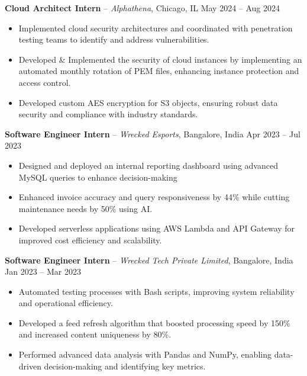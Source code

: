 \documentclass[10pt, letterpaper]{article}
\begin{document}
\textbf{\textcolor{myNavy}{Cloud Architect Intern}} -- \textit{Alphathena}, Chicago, IL \hfill \textcolor{myDarkGray}{May 2024 -- Aug 2024}
\begin{itemize}[leftmargin=*, itemsep=0pt, parsep=0pt]
    \item Implemented cloud security architectures and coordinated with penetration testing teams to identify and address vulnerabilities.
    \item Developed \& Implemented the security of cloud instances by implementing an automated monthly rotation of PEM files, enhancing instance protection and access control.
    \item Developed custom AES encryption for S3 objects, ensuring robust data security and compliance with industry standards.
\end{itemize}

\textbf{\textcolor{myNavy}{Software Engineer Intern}} -- \textit{Wrecked Esports}, Bangalore, India \hfill \textcolor{myDarkGray}{Apr 2023 -- Jul 2023}
\begin{itemize}[leftmargin=*, itemsep=0pt, parsep=0pt]
    \item Designed and deployed an internal reporting dashboard using advanced MySQL queries to enhance decision-making
    \item Enhanced invoice accuracy and query responsiveness by 44\% while cutting maintenance needs by 50\% using AI.
    \item Developed serverless applications using AWS Lambda and API Gateway for improved cost efficiency and scalability.
\end{itemize}

\textbf{\textcolor{myNavy}{Software Engineer Intern}} -- \textit{Wrecked Tech Private Limited}, Bangalore, India \hfill \textcolor{myDarkGray}{Jan 2023 -- Mar 2023}
\begin{itemize}[leftmargin=*, itemsep=0pt, parsep=0pt]
    \item Automated testing processes with Bash scripts, improving system reliability and operational efficiency.
    \item Developed a feed refresh algorithm that boosted processing speed by 150\% and increased content uniqueness by 80\%.
    \item Performed advanced data analysis with Pandas and NumPy, enabling data-driven decision-making and identifying key metrics.
\end{itemize}

\vspace{0.08cm}
\end{document}
